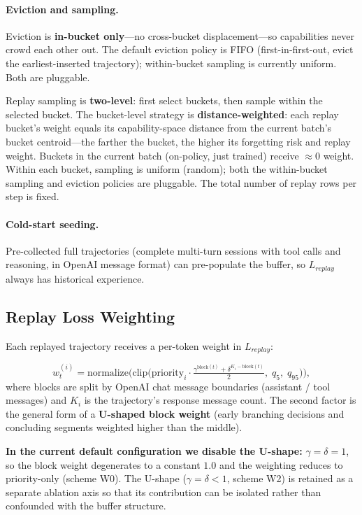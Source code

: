 \paragraph{Eviction and sampling.} Eviction is \textbf{in-bucket only}---no cross-bucket displacement---so capabilities never crowd each other out. The default eviction policy is FIFO (first-in-first-out, evict the earliest-inserted trajectory); within-bucket sampling is currently uniform. Both are pluggable.

Replay sampling is \textbf{two-level}: first select buckets, then sample within the selected bucket. The bucket-level strategy is \textbf{distance-weighted}: each replay bucket's weight equals its capability-space distance from the current batch's bucket centroid---the farther the bucket, the higher its forgetting risk and replay weight. Buckets in the current batch (on-policy, just trained) receive $\approx 0$ weight. Within each bucket, sampling is uniform (random); both the within-bucket sampling and eviction policies are pluggable. The total number of replay rows per step is fixed.

\paragraph{Cold-start seeding.} Pre-collected full trajectories (complete multi-turn sessions with tool calls and reasoning, in OpenAI message format) can pre-populate the buffer, so $L_{replay}$ always has historical experience.

\subsection{Replay Loss Weighting}
\label{sec:replay-weight}

Each replayed trajectory receives a per-token weight in $L_{replay}$:

\begin{equation}
  w_t^{(i)} = \text{normalize}\!\Big(\text{clip}\big(\text{priority}_i \cdot \tfrac{\gamma^{\text{block}(t)} + \delta^{K_i - \text{block}(t)}}{2},\; q_5,\; q_{95}\big)\Big),
  \label{eq:u-weight}
\end{equation}
where blocks are split by OpenAI chat message boundaries (assistant / tool messages) and $K_i$ is the trajectory's response message count. The second factor is the general form of a \textbf{U-shaped block weight} (early branching decisions and concluding segments weighted higher than the middle).

\textbf{In the current default configuration we disable the U-shape:} $\gamma=\delta=1$, so the block weight degenerates to a constant $1.0$ and the weighting reduces to priority-only (scheme W0). The U-shape ($\gamma=\delta<1$, scheme W2) is retained as a separate ablation axis so that its contribution can be isolated rather than confounded with the buffer structure.
